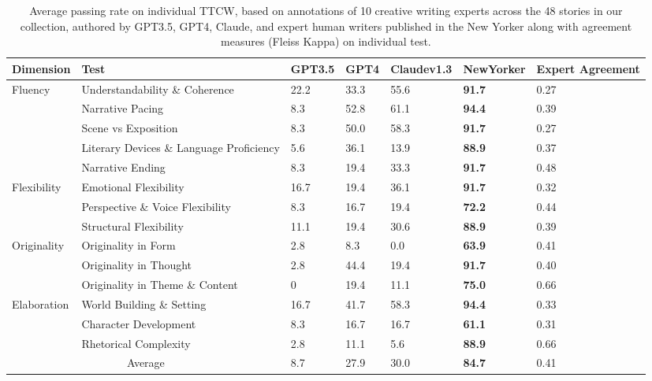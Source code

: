 \begin{table*}[!ht]
\small
\centering
\begin{tabular}{|l|l|l|l|l|l|l|}
\hline
Dimension & Test & GPT3.5 & GPT4 & Claudev1.3 & NewYorker & Expert Agreement \\ \hline
\multirow{5}{*}{Fluency} & Understandability \& Coherence & 22.2 & 33.3 & 55.6 & \textbf{91.7} & 0.27 \\ \cline{2-7}
& Narrative Pacing & 8.3 & 52.8 & 61.1 & \textbf{94.4} & 0.39 \\ \cline{2-7}
& Scene vs Exposition & 8.3 & 50.0 & 58.3 & \textbf{91.7} & 0.27 \\ \cline{2-7}
& Literary Devices \& Language Proficiency & 5.6 & 36.1 & 13.9 & \textbf{88.9} & 0.37 \\ \cline{2-7}
& Narrative Ending & 8.3 & 19.4 & 33.3 & \textbf{91.7} & 0.48 \\ \hline\hline
\multirow{3}{*}{Flexibility} & Emotional Flexibility & 16.7 & 19.4 & 36.1 & \textbf{91.7} & 0.32 \\ \cline{2-7}
& Perspective \& Voice Flexibility & 8.3 & 16.7 & 19.4 & \textbf{72.2} & 0.44 \\ \cline{2-7}
& Structural Flexibility & 11.1 & 19.4 & 30.6 & \textbf{88.9} & 0.39 \\ \hline\hline
\multirow{3}{*}{Originality} & Originality in Form & 2.8 & 8.3 & 0.0 & \textbf{63.9} & 0.41 \\ \cline{2-7}
& Originality in Thought & 2.8 & 44.4 & 19.4 & \textbf{91.7} & 0.40 \\ \cline{2-7}
& Originality in Theme \& Content & 0 & 19.4 & 11.1 & \textbf{75.0} & 0.66 \\ \hline\hline
\multirow{3}{*}{Elaboration} & World Building \& Setting & 16.7 & 41.7 & 58.3 & \textbf{94.4} & 0.33 \\ \cline{2-7}
& Character Development & 8.3 & 16.7 & 16.7 & \textbf{61.1} & 0.31 \\ \cline{2-7}
& Rhetorical Complexity & 2.8 & 11.1 & 5.6 & \textbf{88.9} & 0.66 \\ \hline\hline
\multicolumn{2}{|c|}{Average} & 8.7 &27.9 & 30.0 & \textbf{84.7} & 0.41 \\ \hline
\end{tabular}
\vspace{2ex}
\caption{\label{absolutehumaneval} Average passing rate on individual TTCW, based on annotations of 10 creative writing experts across the 48 stories in our collection, authored by GPT3.5, GPT4, Claude, and expert human writers published in the New Yorker along with agreement measures (Fleiss Kappa) on individual test.}
\end{table*}

